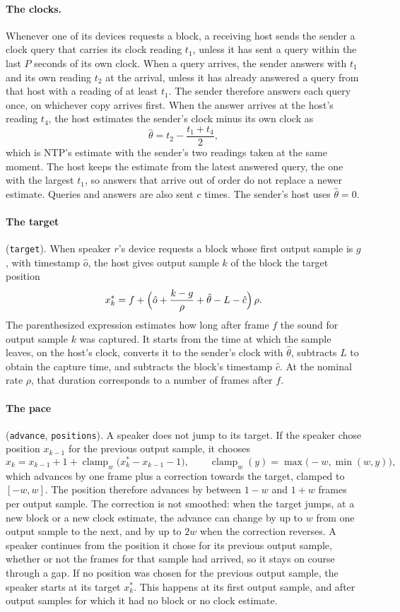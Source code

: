 \documentclass[11pt,a4paper]{article}
\newcommand{\lean}[1]{\texttt{#1}}
\newcommand{\clamp}{\operatorname{clamp}}
\theoremstyle{definition}
\begin{document}
\paragraph{The clocks.} Whenever one of its devices requests a block, a
receiving host sends the sender a clock query that carries its clock
reading $t_1$, unless it has sent a query within the last $P$ seconds of its
own clock. When a query arrives, the sender answers with $t_1$ and its own
reading $t_2$ at the arrival, unless it has already answered a query from
that host with a reading of at least $t_1$. The sender therefore answers
each query once, on whichever copy arrives first. When the answer arrives
at the host's reading $t_4$, the host estimates the sender's clock minus its
own clock as
\[
  \hat\theta = t_2 - \frac{t_1 + t_4}{2},
\]
which is NTP's estimate with the sender's two readings taken at the same
moment. The host keeps the estimate from the latest answered query, the one
with the largest $t_1$, so answers that arrive out of order do not replace a
newer estimate. Queries and answers are also sent $c$ times. The sender's
host uses $\hat\theta = 0$.

\paragraph{The target} (\lean{target}). When speaker $r$'s device requests a
block whose first output sample is $g$, with timestamp $\hat o$, the host
gives output sample $k$ of the block the target position
\[
  x^*_k = f + \Bigl(\hat o + \frac{k - g}{\rho} + \hat\theta - L - \hat c\Bigr)\,\rho .
\]
The parenthesized expression estimates how long after frame $f$ the sound
for output sample $k$ was captured. It starts from the time at which the
sample leaves, on the host's clock, converts it to the sender's clock with
$\hat\theta$, subtracts $L$ to obtain the capture time, and subtracts the
block's timestamp $\hat c$. At the nominal rate $\rho$, that duration
corresponds to a number of frames after $f$.

\paragraph{The pace} (\lean{advance}, \lean{positions}). A speaker does not
jump to its target. If the speaker chose position $x_{k-1}$ for the previous
output sample, it chooses
\[
  x_k = x_{k-1} + 1 + \clamp_w\bigl(x^*_k - x_{k-1} - 1\bigr),
  \qquad \clamp_w(y) = \max\bigl(-w, \min(w, y)\bigr),
\]
which advances by one frame plus a correction towards the target, clamped
to $[-w, w]$. The position therefore advances by between $1 - w$ and $1 + w$
frames per output sample. The correction is not smoothed: when the target
jumps, at a new block or a new clock estimate, the advance can change by up
to $w$ from one output sample to the next, and by up to $2w$ when the
correction reverses. A speaker continues from the position it chose for its
previous output sample, whether or not the frames for that sample had
arrived, so it stays on course through a gap. If no position was chosen for
the previous output sample, the speaker starts at its target $x^*_k$. This
happens at its first output sample, and after output samples for which it
had no block or no clock estimate.
\end{document}
